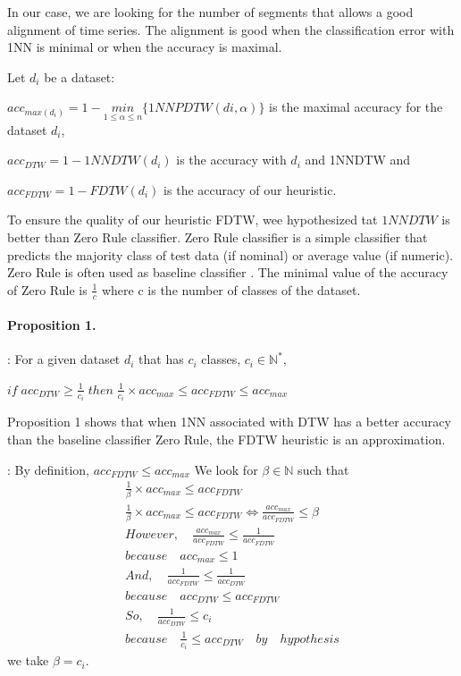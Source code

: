 In our case, we are looking for the number of segments that allows a good
alignment of time series. The alignment is good when the classification error
with 1NN is minimal or when the accuracy is maximal.


Let $d_i$ be a dataset:

$acc_{max(d_i)} = 1-\underset{1\leq\alpha\leq n}{min}\{1NNPDTW(di,\alpha)\}$ is the maximal accuracy
for the dataset $d_i$,

$acc_{DTW} = 1 - 1NNDTW(d_i)$ is the accuracy with $d_i$ and 1NNDTW and


$acc_{FDTW}=1 - FDTW(d_i)$ is the accuracy of our heuristic.

To ensure the quality of our heuristic FDTW, wee hypothesized tat $1NNDTW$ is better than
Zero Rule classifier. Zero Rule classifier is a simple classifier that predicts the majority class of test data (if nominal) or average value (if numeric). Zero Rule is often
used as baseline classifier \cite{cuvrin2007meeting}. The minimal value of the
accuracy of Zero Rule is $\frac{1}{c}$ where c is the number of classes of the
dataset.

\paragraph{Proposition 1.}:
For a given dataset $d_i$ that has $c_i$ classes, $c_i\in \mathbb{N}^*,$

$
if \; acc_{DTW} \geq \frac{1}{c_i} \; then \;  \frac{1}{c_i} \times acc_{max}
\leq acc_{FDTW} \leq acc_{max}
$

Proposition 1 shows that when 1NN associated with DTW has a better accuracy than the baseline
classifier Zero Rule, the FDTW heuristic is an approximation.

\begin{flushleft}:
By definition, $ acc_{FDTW} \leq acc_{max}$ 
We look for $\beta \in \mathbb{N}$ such that 
\begin{eqnarray}
\frac{1}{\beta} \times acc_{max} \leq acc_{FDTW} \\
\frac{1}{\beta}\times acc_{max}\leq acc_{FDTW}\Leftrightarrow\frac{acc_{max}}{acc_{FDTW}}\leq \beta \\
However,\quad \frac{acc_{max}}{acc_{FDTW}}\leq\frac{1}{acc_{FDTW}}\quad \\
because\quad acc_{max}\leq1
\\
And,\quad \frac{1}{acc_{FDTW}}\leq\frac{1}{acc_{DTW}} \quad \\
because \quad acc_{DTW}\leq acc_{FDTW}
\\
So,\quad \frac{1}{acc_{DTW}}\leq c_{i} \quad \\
because \quad \frac{1}{c_{i}}\leq
acc_{DTW} \quad by \quad hypothesis
\end{eqnarray}
we take $\beta = c_{i}$.

\end{flushleft}


